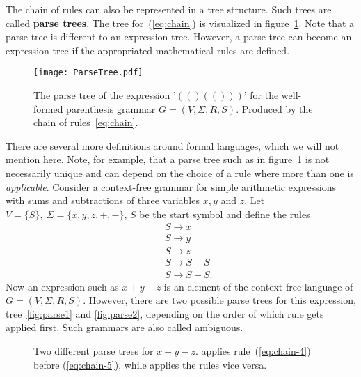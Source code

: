The chain of rules can also be represented in a tree structure. Such trees are called \textbf{parse trees}. The tree for~(\ref{eq:chain}) is visualized in figure~\ref{fig:parseTree}. Note that a parse tree is different to an expression tree. However, a parse tree can become an expression tree if the appropriated mathematical rules are defined.

\begin{figure}[ht]
	\centering
	\texttt{[image: ParseTree.pdf]}
	\caption{The parse tree of the expression '$(()(()))$' for the well-formed parenthesis grammar $G = (V, \Sigma, R, S)$. Produced by the chain of rules~\ref{eq:chain}.}
	\label{fig:parseTree}
\end{figure}

There are several more definitions around formal languages, which we will not mention here. Note, for example, that a parse tree such as in figure~\ref{fig:parseTree} is not necessarily unique and can depend on the choice of a rule where more than one is \textit{applicable}. Consider a context-free grammar for simple arithmetic expressions with sums and subtractions of three variables $x,y$ and $z$. Let $V = \{S\},\ \Sigma = \{x,y,z,+,-\}$, $S$ be the start symbol and define the rules
\begin{eqnarray}
&&S \longrightarrow x\label{eq:chain-1}\\
&&S \longrightarrow y\label{eq:chain-2}\\
&&S \longrightarrow z\label{eq:chain-3}\\
&&S \longrightarrow S + S\label{eq:chain-4}\\
&&S \longrightarrow S - S\label{eq:chain-5}.
\end{eqnarray}
Now an expression such as $x+y-z$ is an element of the context-free language of $G = (V, \Sigma, R, S)$. However, there are two possible parse trees for this expression, tree~\ref{fig:parse1} and \ref{fig:parse2}, depending on the order of which rule gets applied first. Such grammars are also called ambiguous.

\begin{figure}[!ht]
    \centering
    \hspace{2cm}
    \caption{Two different parse trees for $x+y-z$. \protect{} applies rule~(\ref{eq:chain-4}) before (\ref{eq:chain-5}), while \protect{} applies the rules vice versa.}
    \label{fig:parseMulti}
\end{figure}

